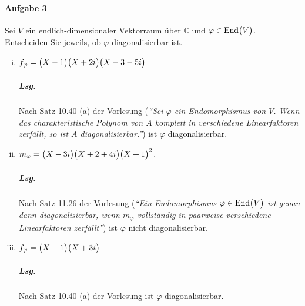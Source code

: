 \documentclass{scrreprt}
\newcommand\End{\text{End}}
\begin{document}
\paragraph{Aufgabe 3} Sei $V$ ein endlich-dimensionaler Vektorraum über
$\mathbb{C}$ und $\varphi \in \End\qty\big(V)$.
Entscheiden Sie jeweils, ob $\varphi$ diagonalisierbar ist.

\begin{enumerate}[(i)]
\item $f_{\varphi} = \qty\big(X - 1)\qty\big(X + 2i)\qty\big(X - 3 - 5i)$

  \subparagraph{Lsg.} Nach Satz 10.40 (a) der Vorlesung (\emph{``Sei $\varphi$
    ein Endomorphismus von $V$.
    Wenn das charakteristische Polynom von $A$ komplett in verschiedene
    Linearfaktoren zerfällt, so ist $A$ diagonalisierbar.''}) ist
  $\varphi$ diagonalisierbar.

\item $m_{\varphi} = \qty\big(X - 3i)\qty\big(X + 2 + 4i)\qty\big(X + 1)^2$.

  \subparagraph{Lsg.} Nach Satz 11.26 der Vorlesung (\emph{``Ein Endomorphismus
    $\varphi \in \End\qty\big(V)$ ist genau dann diagonalisierbar, wenn
    $m_{\varphi}$ vollständig in paarweise verschiedene Linearfaktoren
    zerfällt''}) ist $\varphi$ nicht diagonalisierbar.

\item $f_{\varphi} = \qty\big(X - 1)\qty\big(X + 3i)$

  \subparagraph{Lsg.} Nach Satz 10.40 (a) der Vorlesung ist $\varphi$
  diagonalisierbar.
\end{enumerate}
\newpage
\end{document}
